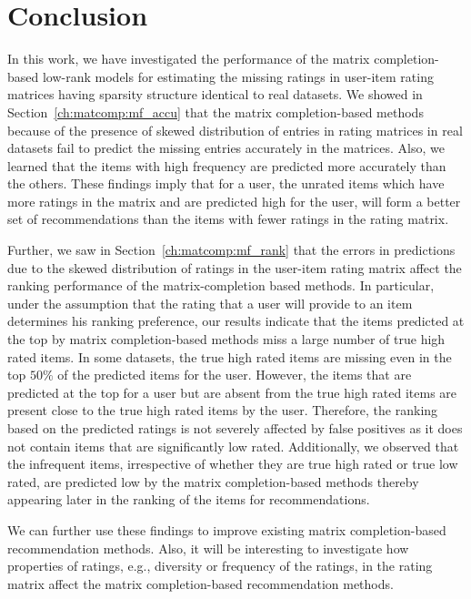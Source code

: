 \section{Conclusion} \label{ch:matcomp:conclusion}


In this work, we have investigated the performance of the matrix
completion-based low-rank models for estimating the missing ratings
in  user-item rating matrices having sparsity structure identical 
to real datasets. We showed in
Section~\ref{ch:matcomp:mf_accu} that the matrix completion-based methods because of the
presence of skewed distribution of entries in rating matrices in real
datasets fail to predict the missing entries accurately in the matrices. Also,
we learned that the items with high frequency are predicted more accurately than
the others. These findings imply that for a user, the unrated items which have more ratings 
in the matrix and are predicted high for the user, will form a better set of recommendations 
than the items with fewer ratings in the rating matrix.


Further, we saw in Section~\ref{ch:matcomp:mf_rank} that the errors in predictions due to
the skewed distribution of ratings in the user-item rating matrix 
affect the ranking performance of the matrix-completion based methods.
In particular, under the assumption that the rating that a user will provide to an item determines his
ranking preference, our results indicate that the items predicted at the top by matrix completion-based
methods miss a large number of true high rated items. In some datasets, the true
high rated items are missing even in the top $50\%$ of the predicted items for
the user.
However, the items that are predicted at the top for a user but are absent from
the true high rated items are present close to the true high rated items by the
user. Therefore, the ranking based on the predicted ratings is not severely
affected by false positives as it does not contain items that are significantly
low rated.
Additionally, we observed that the infrequent items, irrespective of whether 
they are true high rated or true low rated, are predicted low by the matrix
completion-based methods thereby appearing later in the ranking
of the items for recommendations.

We can further use these findings to improve existing matrix completion-based recommendation methods.
Also, it will be interesting to investigate how 
properties of ratings, e.g., diversity or frequency of the ratings, in the rating matrix
affect the matrix completion-based recommendation methods.

